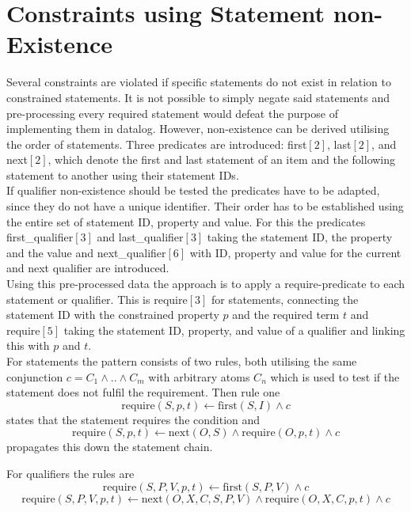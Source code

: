 \documentclass[hyperref,bachelorofscience,fleqn]{cgvpub}
\begin{document}
\section{Constraints using Statement non-Existence}
Several constraints are violated if specific statements do not exist in relation to constrained statements. It is not possible to simply negate said statements and pre-processing every required statement would defeat the purpose of implementing them in datalog. However, non-existence can be derived utilising the order of statements. Three predicates are introduced: first\([2]\), last\([2]\), and next\([2]\), which denote the first and last statement of an item and the following statement to another using their statement IDs.\\

If qualifier non-existence should be tested the predicates have to be adapted, since they do not have a unique identifier. Their order has to be established using the entire set of statement ID, property and value. For this the predicates first\_qualifier\([3]\) and last\_qualifier\([3]\) taking the statement ID, the property and the value and next\_qualifier\([6]\) with ID, property and value for the current and next qualifier are introduced.\\

Using this pre-processed data the approach is to apply a require-predicate to each statement or qualifier. This is require\([3]\) for statements, connecting the statement ID with the constrained property \(p\) and the required term \(t\) and require\([5]\) taking the statement ID, property, and value of a qualifier and linking this with \(p\) and \(t\).\\

For statements the pattern consists of two rules, both utilising the same conjunction \(c = C_1 \wedge .. \wedge C_m\) with arbitrary atoms \(C_n\) which is used to test if the statement does not fulfil the requirement. Then rule one
\begin{equation*}
\text{require}(S, p, t) \leftarrow \text{first}(S, I) \wedge c
\end{equation*}
states that the statement requires the condition and
\begin{equation*}
\text{require}(S, p, t) \leftarrow \text{next}(O, S) \wedge \text{require}(O, p, t) \wedge c
\end{equation*}
propagates this down the statement chain.

For qualifiers the rules are
\begin{equation*}
\text{require}(S, P, V, p, t) \leftarrow \text{first}(S, P, V) \wedge c
\end{equation*}
\begin{equation*}
\text{require}(S, P, V, p, t) \leftarrow \text{next}(O, X, C, S, P, V) \wedge \text{require}(O, X, C, p, t) \wedge c
\end{equation*}
\end{document}
